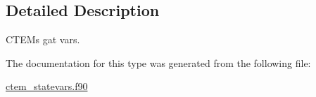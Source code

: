\subsection{Detailed Description}
C\+T\+E\+M\textquotesingle{}s \textquotesingle{}gat\textquotesingle{} vars. 

The documentation for this type was generated from the following file\+:\begin{DoxyCompactItemize}
\item 
\hyperlink{ctem__statevars_8f90}{ctem\+\_\+statevars.\+f90}\end{DoxyCompactItemize}
